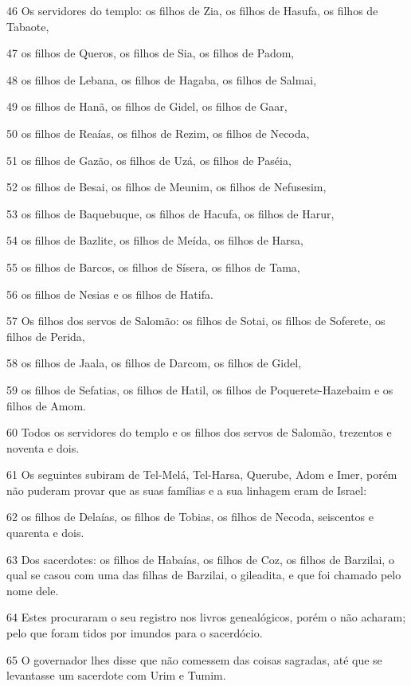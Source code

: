 \par 46 Os servidores do templo: os filhos de Zia, os filhos de Hasufa, os filhos de Tabaote,
\par 47 os filhos de Queros, os filhos de Sia, os filhos de Padom,
\par 48 os filhos de Lebana, os filhos de Hagaba, os filhos de Salmai,
\par 49 os filhos de Hanã, os filhos de Gidel, os filhos de Gaar,
\par 50 os filhos de Reaías, os filhos de Rezim, os filhos de Necoda,
\par 51 os filhos de Gazão, os filhos de Uzá, os filhos de Paséia,
\par 52 os filhos de Besai, os filhos de Meunim, os filhos de Nefusesim,
\par 53 os filhos de Baquebuque, os filhos de Hacufa, os filhos de Harur,
\par 54 os filhos de Bazlite, os filhos de Meída, os filhos de Harsa,
\par 55 os filhos de Barcos, os filhos de Sísera, os filhos de Tama,
\par 56 os filhos de Nesias e os filhos de Hatifa.
\par 57 Os filhos dos servos de Salomão: os filhos de Sotai, os filhos de Soferete, os filhos de Perida,
\par 58 os filhos de Jaala, os filhos de Darcom, os filhos de Gidel,
\par 59 os filhos de Sefatias, os filhos de Hatil, os filhos de Poquerete-Hazebaim e os filhos de Amom.
\par 60 Todos os servidores do templo e os filhos dos servos de Salomão, trezentos e noventa e dois.
\par 61 Os seguintes subiram de Tel-Melá, Tel-Harsa, Querube, Adom e Imer, porém não puderam provar que as suas famílias e a sua linhagem eram de Israel:
\par 62 os filhos de Delaías, os filhos de Tobias, os filhos de Necoda, seiscentos e quarenta e dois.
\par 63 Dos sacerdotes: os filhos de Habaías, os filhos de Coz, os filhos de Barzilai, o qual se casou com uma das filhas de Barzilai, o gileadita, e que foi chamado pelo nome dele.
\par 64 Estes procuraram o seu registro nos livros genealógicos, porém o não acharam; pelo que foram tidos por imundos para o sacerdócio.
\par 65 O governador lhes disse que não comessem das coisas sagradas, até que se levantasse um sacerdote com Urim e Tumim.
